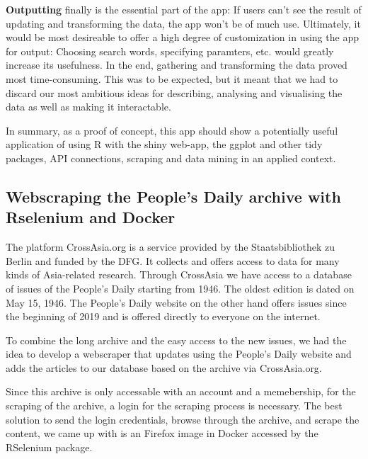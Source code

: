 \documentclass[12pt,a4paper]{article}
\begin{document}
\textbf{Outputting} finally is the essential part of the app: If users
can't see the result of updating and transforming the data, the app
won't be of much use. Ultimately, it would be most desireable to offer a
high degree of customization in using the app for output: Choosing
search words, specifying paramters, etc. would greatly increase its
usefulness. In the end, gathering and transforming the data proved most
time-consuming. This was to be expected, but it meant that we had to
discard our most ambitious ideas for describing, analysing and
visualising the data as well as making it interactable.

In summary, as a proof of concept, this app should show a potentially
useful application of using R with the shiny web-app, the ggplot and
other tidy packages, API connections, scraping and data mining in an
applied context.

\hypertarget{webscraping-the-peoples-daily-archive-with-rselenium-and-docker}{%
\subsection{Webscraping the People's Daily archive with Rselenium and
Docker}\label{webscraping-the-peoples-daily-archive-with-rselenium-and-docker}}

The platform CrossAsia.org is a service provided by the Staatsbibliothek
zu Berlin and funded by the DFG. It collects and offers access to data
for many kinds of Asia-related research. Through CrossAsia we have
access to a database of issues of the People's Daily starting from 1946.
The oldest edition is dated on May 15, 1946. The People's Daily website
on the other hand offers issues since the beginning of 2019 and is
offered directly to everyone on the internet.

To combine the long archive and the easy access to the new issues, we
had the idea to develop a webscraper that updates using the People's
Daily website and adds the articles to our database based on the archive
via CrossAsia.org.

Since this archive is only accessable with an account and a memebership,
for the scraping of the archive, a login for the scraping process is
necessary. The best solution to send the login credentials, browse
through the archive, and scrape the content, we came up with is an
Firefox image in Docker accessed by the RSelenium package.
\end{document}
